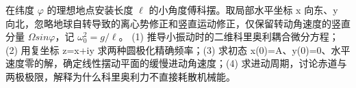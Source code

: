 在纬度 \(\varphi \) 的理想地点安装长度 \(\ell \) 的小角度傅科摆。取局部水平坐标 x 向东、y 向北，忽略地球自转导致的离心势修正和竖直运动修正，仅保留转动角速度的竖直分量 \(\Omega sin\varphi \)，记 \(\omega _{0}^{2}=g/\ell \)。
(1) 推导小振动时的二维科里奥利耦合微分方程；(2) 用复坐标 z=x+iy 求两种圆极化精确频率；(3) 求初态 x(0)=A、y(0)=0、水平速度零的解，确定线性摆动平面的缓慢进动角速度；(4) 求进动周期，讨论赤道与两极极限，解释为什么科里奥利力不直接耗散机械能。
